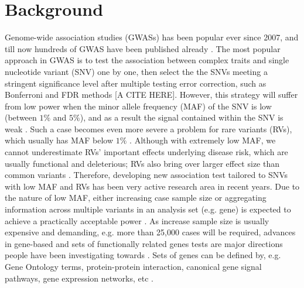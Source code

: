 \documentclass[12pt]{article}
\begin{document}
\newpage
\tableofcontents

\newpage
\listoftables

\newpage
\listoffigures
 

\newpage
\section{Background}\label{sec:background}
\doublespacing
Genome-wide association studies (GWASs) has been popular ever since 2007, and till now hundreds of GWAS have been published already \cite{McCarthy2008}. The most popular approach in GWAS is to test the association between complex traits and single nucleotide variant (SNV) one by one, then select the the SNVs meeting a stringent significance level after multiple testing error correction, such as Bonferroni and FDR methods [A CITE HERE]. However, this strategy will suffer from low power when the minor allele frequency (MAF) of the SNV is low (between $1\%$ and $5\%$), and as a result the signal contained within the SNV is weak \cite{Sham2014}. Such a case becomes even more severe a problem for rare variants (RVs), which usually has MAF below $1\%$ \cite{Bansal2010}. Although with extremely low MAF, we cannot underestimate RVs' important effects underlying disease risk, which are usually functional and deleterious; RVs also bring over larger effect size than common variants \cite{Fu2013,Bansal2010,Sham2014}. Therefore, developing new association test tailored to SNVs with low MAF and RVs has been very active research area in recent years. Due to the nature of low MAF, either increasing case sample size or aggregating information across multiple variants in an analysis set (e.g. gene) is expected to achieve a practically acceptable power \cite{Capanu2011,Basu2011,Bansal2010,Sham2014}. As increase sample size is usually expensive and demanding, e.g. more than 25,000 cases will be required, advances in gene-based and sets of functionally related genes tests are major directions people have been investigating towards \cite{Ye2011,Pinto2010,Sham2014}. Sets of genes can be defined by, e.g. Gene Ontology terms, protein-protein interaction, canonical gene signal pathways, gene expression networks, etc \cite{Sham2014,DelaCruz2010,Weng2011,Wang2010}.
\end{document}
